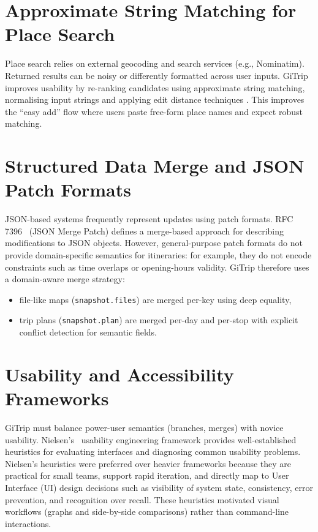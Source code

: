 \section{Approximate String Matching for Place Search}
Place search relies on external geocoding and search services (e.g., Nominatim).
Returned results can be noisy or differently formatted across user inputs. GiTrip
improves usability by re-ranking candidates using approximate string matching,
normalising input strings and applying edit distance techniques
\cite{ref_navaro_string_matching}. This improves the ``easy add'' flow where
users paste free-form place names and expect robust matching.

\section{Structured Data Merge and JSON Patch Formats}
JSON-based systems frequently represent updates using patch formats. RFC 7396~\cite{ref_rfc7396}
(JSON Merge Patch) defines a merge-based approach for describing modifications
to JSON objects. However, general-purpose patch formats do
not provide domain-specific semantics for itineraries: for example, they do not
encode constraints such as time overlaps or opening-hours validity. GiTrip
therefore uses a domain-aware merge strategy:
\begin{itemize}
  \item file-like maps (\texttt{snapshot.files}) are merged per-key using deep
        equality,
  \item trip plans (\texttt{snapshot.plan}) are merged per-day and per-stop with
        explicit conflict detection for semantic fields.
\end{itemize}

\section{Usability and Accessibility Frameworks}
GiTrip must balance power-user semantics (branches, merges) with novice
usability. Nielsen's~\cite{ref_nielsen} usability engineering framework provides well-established
heuristics for evaluating interfaces and diagnosing common usability problems. Nielsen's heuristics were preferred over heavier frameworks
because they are practical for small teams, support rapid iteration, and directly
map to User Interface (UI) design decisions such as visibility of system state, consistency, error
prevention, and recognition over recall. These heuristics motivated visual workflows (graphs and side-by-side comparisons) rather than command-line interactions.


